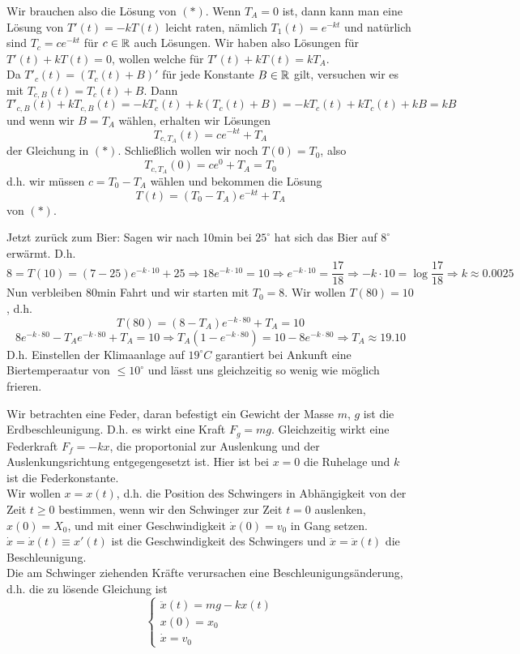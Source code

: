 \begin{beispiel}[Bier]
\begin{enumerate}
		Wir brauchen also die L\"osung von $ (\ast) $. Wenn $ T_A=0 $ ist, dann kann man eine L\"osung von $ T'(t)=-kT(t) $ leicht raten, n\"amlich $ T_1(t)=e^{-kt} $ und nat\"urlich sind $ T_c=ce^{-kt} $ f\"ur $ c\in\mathbb{R} $ auch L\"osungen. Wir haben also L\"osungen f\"ur $ T'(t)+kT(t)=0 $, wollen welche f\"ur $ T'(t)+kT(t)=kT_A $.\\
		Da $ T'_c(t)=(T_c(t)+B)' $ f\"ur jede Konstante $ B\in\mathbb{R} $ gilt, versuchen wir es mit $ T_{c,B}(t)=T_c(t)+B $. Dann
		\[ T'_{c,B}(t)+kT_{c,B}(t)=-kT_c(t)+k(T_c(t)+B)=-kT_c(t)+kT_c(t)+kB=kB \]
		und wenn wir $ B=T_A $ w\"ahlen, erhalten wir L\"osungen
		\[ T_{c,T_A}(t)=ce^{-kt}+T_A \]
		der Gleichung in $ (\ast) $. Schlie\ss lich wollen wir noch $ T(0)=T_0 $, also
		\[ T_{c,T_A}(0)=ce^0+T_A=T_0 \]
		d.h. wir m\"ussen $ c=T_0-T_A $ w\"ahlen und bekommen die L\"osung
		\[ T(t)=(T_0-T_A)e^{-kt}+T_A \]
		von $ (\ast) $.
	\end{enumerate}
	Jetzt zur\"uck zum Bier: Sagen wir nach 10min bei $ 25^\circ $ hat sich das Bier auf $ 8^\circ $ erw\"armt. D.h.
	\[ 8=T(10)=(7-25)e^{-k\cdot 10}+25\Rightarrow 18e^{-k\cdot 10}=10\Rightarrow e^{-k\cdot 10}=\frac{17}{18}\Rightarrow -k\cdot 10=\log\frac{17}{18}\Rightarrow k\approx 0.0025 \]
	Nun verbleiben 80min Fahrt und wir starten mit $ T_0=8 $. Wir wollen $ T(80)=10 $, d.h.
	\[ T(80)=(8-T_A)e^{-k\cdot 80}+T_A=10 \]
	\[ 8e^{-k\cdot 80}-T_Ae^{-k\cdot 80}+T_A=10\Rightarrow T_A(1-e^{-k\cdot 80})=10-8e^{-k\cdot 80}\Rightarrow T_A\approx 19.10 \]
	D.h. Einstellen der Klimaanlage auf $ 19^\circ C $ garantiert bei Ankunft eine Biertemperaatur von $ \leq 10^\circ $ und l\"asst uns gleichzeitig so wenig wie m\"oglich frieren.
\end{beispiel}
\begin{beispiel}
	Wir betrachten eine Feder, daran befestigt ein Gewicht der Masse $ m $, $ g $ ist die Erdbeschleunigung. D.h. es wirkt eine Kraft $ F_g=mg $. Gleichzeitig wirkt eine Federkraft $ F_f=-kx $, die proportonial zur Auslenkung und der Auslenkungsrichtung entgegengesetzt ist. Hier ist bei $ x=0 $ die Ruhelage und $ k $ ist die Federkonstante.\\
	Wir wollen $ x=x(t) $, d.h. die Position des Schwingers in Abh\"angigkeit von der Zeit $ t\geq 0 $ bestimmen, wenn wir den Schwinger zur Zeit $ t=0 $ auslenken, $ x(0)=X_0 $, und mit einer Geschwindigkeit $ \dot x(0)=v_0 $ in Gang setzen. $ \dot x=\dot x(t)\equiv x'(t) $ ist die Geschwindigkeit des Schwingers und $ \ddot x=\ddot x(t) $ die Beschleunigung.\\
	Die am Schwinger ziehenden Kr\"afte verursachen eine Beschleunigungs\"anderung, d.h. die zu l\"osende Gleichung ist
	\[ \begin{cases}
	\ddot x(t)=mg-kx(t)\\ x(0)=x_0\\ \dot x=v_0
	\end{cases} \]
\end{beispiel}
